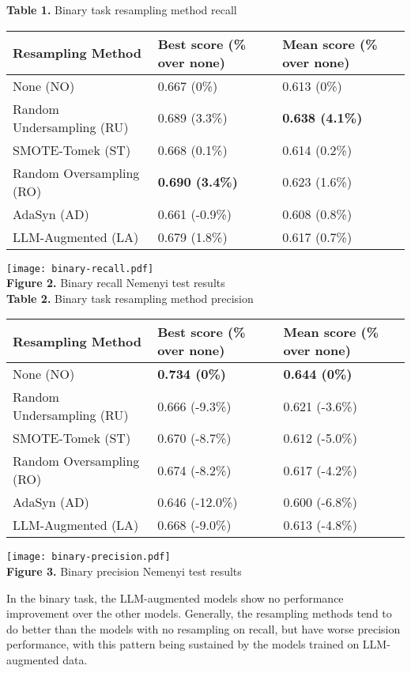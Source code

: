 \documentclass[runningheads]{llncs}
\newenvironment{nscenter}
 {\parskip=0pt\par\nopagebreak\centering}
 {\par\noindent\ignorespacesafterend}
\begin{document}
\begin{nscenter}
{\bf Table 1.} Binary task resampling method recall\\

\begin{tabular}{|l|l|l|}
\hline
Resampling Method & Best score (\% over none) & Mean score (\% over none) \\\hline
None (NO) & 0.667 (0\%) & 0.613 (0\%) \\\hline
Random Undersampling (RU) & 0.689 (3.3\%) & {\bf 0.638 (4.1\%)} \\\hline
SMOTE-Tomek (ST) & 0.668 (0.1\%) & 0.614 (0.2\%) \\\hline
Random Oversampling (RO) & {\bf 0.690 (3.4\%)} & 0.623 (1.6\%) \\\hline
AdaSyn (AD) & 0.661 (-0.9\%) & 0.608 (0.8\%) \\\hline
LLM-Augmented (LA) & 0.679 (1.8\%) & 0.617 (0.7\%) \\\hline
\end{tabular}

\texttt{[image: binary-recall.pdf]}\\
{\bf Figure 2.} Binary recall Nemenyi test results\\
\vspace{\baselineskip}
{\bf Table 2.} Binary task resampling method precision\\

\begin{tabular}{|l|l|l|}
\hline
Resampling Method & Best score (\% over none) & Mean score (\% over none) \\\hline
None (NO) & {\bf 0.734 (0\%)} & {\bf 0.644 (0\%)} \\\hline
Random Undersampling (RU) & 0.666 (-9.3\%) & 0.621 (-3.6\%) \\\hline
SMOTE-Tomek (ST) & 0.670 (-8.7\%) & 0.612 (-5.0\%) \\\hline
Random Oversampling (RO) & 0.674 (-8.2\%) & 0.617 (-4.2\%) \\\hline
AdaSyn (AD) & 0.646 (-12.0\%) & 0.600 (-6.8\%) \\\hline
LLM-Augmented (LA) & 0.668 (-9.0\%) & 0.613 (-4.8\%) \\\hline
\end{tabular}

\texttt{[image: binary-precision.pdf]}\\
{\bf Figure 3.} Binary precision Nemenyi test results
\end{nscenter}
In the binary task, the LLM-augmented models show no performance improvement over the other models. Generally, the resampling methods tend to do better than the models with no resampling on recall, but have worse precision performance, with this pattern being sustained by the models trained on LLM-augmented data.
\end{document}

